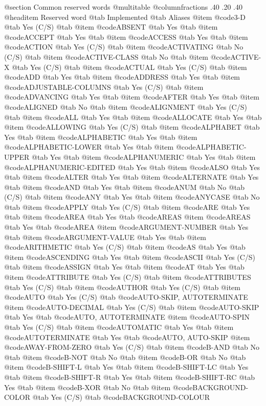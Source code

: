 @section Common reserved words
@multitable @columnfractions .40 .20 .40
@headitem Reserved word @tab Implemented @tab Aliases
@item @code{3-D} @tab Yes	(C/S) @tab
@item @code{ABSENT} @tab Yes @tab
@item @code{ACCEPT} @tab Yes @tab
@item @code{ACCESS} @tab Yes @tab
@item @code{ACTION} @tab Yes	(C/S) @tab
@item @code{ACTIVATING} @tab No (C/S) @tab
@item @code{ACTIVE-CLASS} @tab No @tab
@item @code{ACTIVE-X} @tab Yes	(C/S) @tab
@item @code{ACTUAL} @tab Yes (C/S) @tab
@item @code{ADD} @tab Yes @tab
@item @code{ADDRESS} @tab Yes @tab
@item @code{ADJUSTABLE-COLUMNS} @tab Yes	(C/S) @tab
@item @code{ADVANCING} @tab Yes @tab
@item @code{AFTER} @tab Yes @tab
@item @code{ALIGNED} @tab No @tab
@item @code{ALIGNMENT} @tab Yes	(C/S) @tab
@item @code{ALL} @tab Yes @tab
@item @code{ALLOCATE} @tab Yes @tab
@item @code{ALLOWING} @tab Yes	(C/S) @tab
@item @code{ALPHABET} @tab Yes @tab
@item @code{ALPHABETIC} @tab Yes @tab
@item @code{ALPHABETIC-LOWER} @tab Yes @tab
@item @code{ALPHABETIC-UPPER} @tab Yes @tab
@item @code{ALPHANUMERIC} @tab Yes @tab
@item @code{ALPHANUMERIC-EDITED} @tab Yes @tab
@item @code{ALSO} @tab Yes @tab
@item @code{ALTER} @tab Yes @tab
@item @code{ALTERNATE} @tab Yes @tab
@item @code{AND} @tab Yes @tab
@item @code{ANUM} @tab No @tab (C/S) @tab
@item @code{ANY} @tab Yes @tab
@item @code{ANYCASE} @tab No @tab
@item @code{APPLY} @tab Yes	(C/S) @tab
@item @code{ARE} @tab Yes @tab
@item @code{AREA} @tab Yes @tab @code{AREAS}
@item @code{AREAS} @tab Yes @tab @code{AREA}
@item @code{ARGUMENT-NUMBER} @tab Yes @tab
@item @code{ARGUMENT-VALUE} @tab Yes @tab
@item @code{ARITHMETIC} @tab Yes	(C/S) @tab
@item @code{AS} @tab Yes @tab
@item @code{ASCENDING} @tab Yes @tab
@item @code{ASCII} @tab Yes	(C/S) @tab
@item @code{ASSIGN} @tab Yes @tab
@item @code{AT} @tab Yes @tab
@item @code{ATTRIBUTE} @tab Yes	(C/S) @tab
@item @code{ATTRIBUTES} @tab Yes	(C/S) @tab
@item @code{AUTHOR} @tab Yes (C/S) @tab
@item @code{AUTO} @tab Yes	(C/S) @tab @code{AUTO-SKIP, AUTOTERMINATE}
@item @code{AUTO-DECIMAL} @tab Yes	(C/S) @tab
@item @code{AUTO-SKIP} @tab Yes @tab @code{AUTO, AUTOTERMINATE}
@item @code{AUTO-SPIN} @tab Yes	(C/S) @tab
@item @code{AUTOMATIC} @tab Yes @tab
@item @code{AUTOTERMINATE} @tab Yes @tab @code{AUTO, AUTO-SKIP}
@item @code{AWAY-FROM-ZERO} @tab Yes	(C/S) @tab
@item @code{B-AND} @tab No @tab
@item @code{B-NOT} @tab No @tab
@item @code{B-OR} @tab No @tab
@item @code{B-SHIFT-L} @tab Yes @tab
@item @code{B-SHIFT-LC} @tab Yes @tab
@item @code{B-SHIFT-R} @tab Yes @tab
@item @code{B-SHIFT-RC} @tab Yes @tab
@item @code{B-XOR} @tab No @tab
@item @code{BACKGROUND-COLOR} @tab Yes	(C/S) @tab @code{BACKGROUND-COLOUR}
